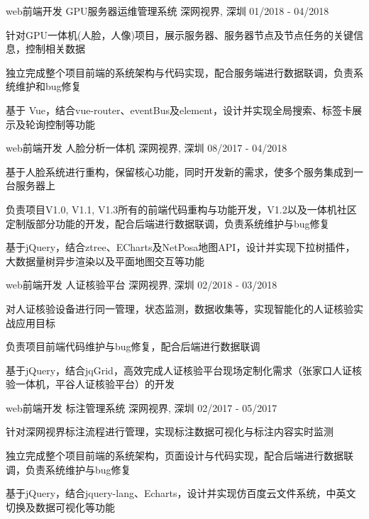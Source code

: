 \begin{cventries}
  \cventry
    {web前端开发}
    {GPU服务器运维管理系统}
    {深网视界, 深圳}
    {01/2018 - 04/2018}
    {
      \begin{cvitems}
        \item {针对GPU一体机(人脸，人像)项目，展示服务器、服务器节点及节点任务的关键信息，控制相关数据}
        \item {独立完成整个项目前端的系统架构与代码实现，配合服务端进行数据联调，负责系统维护和bug修复}
        \item {基于 Vue，结合vue-router、eventBus及element，设计并实现全局搜索、标签卡展示及轮询控制等功能}
      \end{cvitems}
    }
  \cventry
    {web前端开发}
    {人脸分析一体机}
    {深网视界, 深圳}
    {08/2017 - 04/2018}
    {
      \begin{cvitems}
        \item {基于人脸系统进行重构，保留核心功能，同时开发新的需求，使多个服务集成到一台服务器上}
        \item {负责项目V1.0, V1.1, V1.3所有的前端代码重构与功能开发，V1.2以及一体机社区定制版部分功能的开发，配合后端进行数据联调，负责系统维护与bug修复}
        \item {基于jQuery，结合ztree、ECharts及NetPosa地图API，设计并实现下拉树插件，大数据量树异步渲染以及平面地图交互等功能}
      \end{cvitems}
    }
  \cventry
    {web前端开发}
    {人证核验平台}
    {深网视界, 深圳}
    {02/2018 - 03/2018}
    {
      \begin{cvitems}
        \item {对人证核验设备进行同一管理，状态监测，数据收集等，实现智能化的人证核验实战应用目标}
        \item {负责项目前端代码维护与bug修复，配合后端进行数据联调}
        \item {基于jQuery，结合jqGrid，高效完成人证核验平台现场定制化需求（张家口人证核验一体机，平谷人证核验平台）的开发}
      \end{cvitems} 
    }
  \cventry
    {web前端开发}
    {标注管理系统}
    {深网视界, 深圳}
    {02/2017 - 05/2017}
    {
      \begin{cvitems}
        \item {针对深网视界标注流程进行管理，实现标注数据可视化与标注内容实时监测}
        \item {独立完成整个项目前端的系统架构，页面设计与代码实现，配合后端进行数据联调，负责系统维护与bug修复}
        \item {基于jQuery，结合jquery-lang、Echarts，设计并实现仿百度云文件系统，中英文切换及数据可视化等功能}

\end{cvitems}}
\end{cventries}
